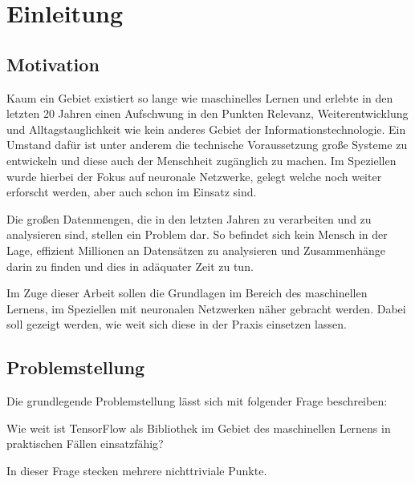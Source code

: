 \chapter{Einleitung}
\label{cha:Einleitung}

\section{Motivation}

Kaum ein Gebiet existiert so lange wie maschinelles Lernen und erlebte in den letzten 20 Jahren einen Aufschwung in den Punkten Relevanz, Weiterentwicklung und Alltagstauglichkeit wie kein anderes Gebiet der Informationstechnologie. 
Ein Umstand dafür ist unter anderem die technische Voraussetzung große Systeme zu entwickeln und diese auch der Menschheit zugänglich zu machen. 
Im Speziellen wurde hierbei der Fokus auf neuronale Netzwerke, gelegt welche noch weiter erforscht werden, aber auch schon im Einsatz sind. \newline

\noindent
Die großen Datenmengen, die in den letzten Jahren zu verarbeiten und zu analysieren sind, stellen ein Problem dar. 
So befindet sich kein Mensch in der Lage, effizient Millionen an Datensätzen zu analysieren und Zusammenhänge darin zu finden und dies in adäquater Zeit zu tun. \newline

\noindent
Im Zuge dieser Arbeit sollen die Grundlagen im Bereich des maschinellen Lernens, im Speziellen mit neuronalen Netzwerken näher gebracht werden. 
Dabei soll gezeigt werden, wie weit sich diese in der Praxis einsetzen lassen. 

\section{Problemstellung}

Die grundlegende Problemstellung lässt sich mit folgender Frage beschreiben: \newline

Wie weit ist TensorFlow als Bibliothek im Gebiet des maschinellen Lernens in praktischen Fällen einsatzfähig? \newline

\noindent
In dieser Frage stecken mehrere nichttriviale Punkte. 

